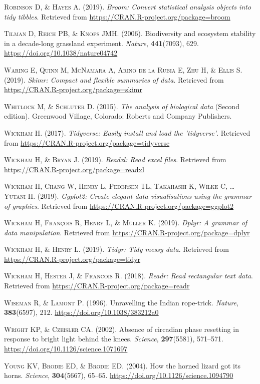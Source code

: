 \documentclass[a4paperpaper,]{article}
\begin{document}
\leavevmode\hypertarget{ref-R-broom}{}%
\textsc{Robinson D, \& Hayes A}. (2019). \emph{Broom: Convert statistical analysis objects into tidy tibbles}. Retrieved from \url{https://CRAN.R-project.org/package=broom}

\leavevmode\hypertarget{ref-tilman2006}{}%
\textsc{Tilman D, Reich PB, \& Knops JMH}. (2006). Biodiversity and ecosystem stability in a decade-long grassland experiment. \emph{Nature}, \textbf{441}(7093), 629. \url{https://doi.org/10.1038/nature04742}

\leavevmode\hypertarget{ref-R-skimr}{}%
\textsc{Waring E, Quinn M, McNamara A, Arino de la Rubia E, Zhu H, \& Ellis S}. (2019). \emph{Skimr: Compact and flexible summaries of data}. Retrieved from \url{https://CRAN.R-project.org/package=skimr}

\leavevmode\hypertarget{ref-whitlock2015}{}%
\textsc{Whitlock M, \& Schluter D}. (2015). \emph{The analysis of biological data} (Second edition). Greenwood Village, Colorado: Roberts and Company Publishers.

\leavevmode\hypertarget{ref-R-tidyverse}{}%
\textsc{Wickham H}. (2017). \emph{Tidyverse: Easily install and load the 'tidyverse'}. Retrieved from \url{https://CRAN.R-project.org/package=tidyverse}

\leavevmode\hypertarget{ref-R-readxl}{}%
\textsc{Wickham H, \& Bryan J}. (2019). \emph{Readxl: Read excel files}. Retrieved from \url{https://CRAN.R-project.org/package=readxl}

\leavevmode\hypertarget{ref-R-ggplot2}{}%
\textsc{Wickham H, Chang W, Henry L, Pedersen TL, Takahashi K, Wilke C, \ldots{} Yutani H}. (2019). \emph{Ggplot2: Create elegant data visualisations using the grammar of graphics}. Retrieved from \url{https://CRAN.R-project.org/package=ggplot2}

\leavevmode\hypertarget{ref-R-dplyr}{}%
\textsc{Wickham H, François R, Henry L, \& Müller K}. (2019). \emph{Dplyr: A grammar of data manipulation}. Retrieved from \url{https://CRAN.R-project.org/package=dplyr}

\leavevmode\hypertarget{ref-R-tidyr}{}%
\textsc{Wickham H, \& Henry L}. (2019). \emph{Tidyr: Tidy messy data}. Retrieved from \url{https://CRAN.R-project.org/package=tidyr}

\leavevmode\hypertarget{ref-R-readr}{}%
\textsc{Wickham H, Hester J, \& Francois R}. (2018). \emph{Readr: Read rectangular text data}. Retrieved from \url{https://CRAN.R-project.org/package=readr}

\leavevmode\hypertarget{ref-wiseman1996}{}%
\textsc{Wiseman R, \& Lamont P}. (1996). Unravelling the Indian rope-trick. \emph{Nature}, \textbf{383}(6597), 212. \url{https://doi.org/10.1038/383212a0}

\leavevmode\hypertarget{ref-Wright2002}{}%
\textsc{Wright KP, \& Czeisler CA}. (2002). Absence of circadian phase resetting in response to bright light behind the knees. \emph{Science}, \textbf{297}(5581), 571--571. \url{https://doi.org/10.1126/science.1071697}

\leavevmode\hypertarget{ref-Young2004}{}%
\textsc{Young KV, Brodie ED, \& Brodie ED}. (2004). How the horned lizard got its horns. \emph{Science}, \textbf{304}(5667), 65--65. \url{https://doi.org/10.1126/science.1094790}
\end{document}
